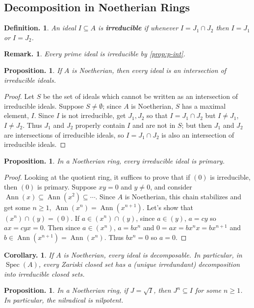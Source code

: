 \documentclass[11pt, a4paper]{memoir}
\theoremstyle{change}
\newtheorem{corollary}[theorem]{Corollary.}
\newtheorem{proposition}[theorem]{Proposition.}
\theoremstyle{plain}
\theoremstyle{nonumberplain}
\newtheorem{definition}{Definition.}
\newtheorem{remark}{Remark.}
\newtheorem{proof}{Proof}
\DeclareMathOperator{\Ann}{Ann}
\DeclareMathOperator{\Spec}{Spec}
\numberwithin{equation}{section}
\begin{document}
\subsection{Decomposition in Noetherian Rings}
\begin{definition}
    An ideal $I\subseteq A$ is \textbf{irreducible} if whenever $I=J_1\cap J_2$ then $I=J_1$ or $I=J_2$.
\end{definition}
\begin{remark}
    Every prime ideal is irreducible by \cref{prop:p-int}.
\end{remark}
\begin{proposition}
    If $A$ is Noetherian, then every ideal is an intersection of irreducible ideals.
\end{proposition}
\begin{proof}
    Let $S$ be the set of ideals which cannot be written as an intersection of irreducible ideals.
    Suppose $S\neq\emptyset$; since $A$ is Noetherian, $S$ has a maximal element, $I$.
    Since $I$ is not irreducible, get $J_1,J_2$ so that $I=J_1\cap J_2$ but $I\neq J_1$, $I\neq J_2$.
    Thus $J_1$ and $J_2$ properly contain $I$ and are not in $S$; but then $J_1$ and $J_2$ are intersections of irreducible ideals, so $I=J_1\cap J_2$ is also an intersection of irreducible ideals.
\end{proof}
\begin{proposition}
    In a Noetherian ring, every irreducible ideal is primary.
\end{proposition}
\begin{proof}
    Looking at the quotient ring, it suffices to prove that if $(0)$ is irreducible, then $(0)$ is primary.
    Suppose $xy=0$ and $y\neq 0$, and consider $\Ann(x)\subseteq\Ann(x^2)\subseteq\cdots$.
    Since $A$ is Noetherian, this chain stabilizes and get some $n\geq 1$, $\Ann(x^n)=\Ann(x^{n+1})$.
    Let's show that $(x^n)\cap(y)=(0)$.
    If $a\in (x^n)\cap(y)$, since $a\in (y)$, $a=cy$ so $ax=cyx=0$.
    Then since $a\in(x^n)$, $a=bx^n$ and $0=ax=bx^nx=bx^{n+1}$ and $b\in\Ann(x^{n+1})=\Ann(x^n)$.
    Thus $bx^n=0$ so $a=0$.
\end{proof}
\begin{corollary}
    If $A$ is Noetherian, every ideal is decomposable.
    In particular, in $\Spec(A)$, every Zariski closed set has a (unique irredundant) decomposition into irreducible closed sets.
\end{corollary}
\begin{proposition}
    In a Noetherian ring, if $J=\sqrt{I}$, then $J^n\subseteq I$ for some $n\geq 1$.
    In particular, the nilradical is nilpotent.
\end{proposition}
\end{document}
